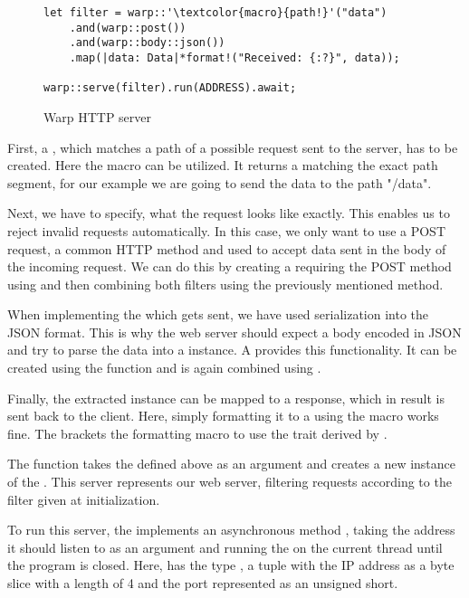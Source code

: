 \begin{figure}[ht]
    \begin{verbatim}
let filter = warp::'\textcolor{macro}{path!}'("data")
    .and(warp::post())
    .and(warp::body::json())
    .map(|data: Data|*format!("Received: {:?}", data));

warp::serve(filter).run(ADDRESS).await;
    \end{verbatim}
    \caption{Warp HTTP server}
    \label{http-server}
\end{figure}

First, a , which matches a path of a possible request sent to the server, has to be created. Here the
macro  can be utilized. It returns a  matching the exact path segment, for our
example we are going to send the data to the path "/data".

Next, we have to specify, what the request looks like exactly. This enables us to reject invalid requests
automatically. In this case, we only want to use a POST request, a common HTTP method and used to accept data sent in
the body of the incoming request. We can do this by creating a  requiring the POST method using
 and then combining both filters using the previously mentioned  method.

When implementing the  which gets sent, we have used serialization into the JSON format. This is why the
web server should expect a body encoded in JSON and try to parse the data into a  instance. A 
provides this functionality. It can be created using the function  and is again combined using
.

Finally, the extracted  instance can be mapped to a response, which in result is sent back to the client.
Here, simply formatting it to a  using the  macro works fine. The 
brackets the formatting macro to use the  trait derived by .

The function  takes the  defined above as an argument and creates a new instance of the
 . This server represents our web server, filtering requests according to the filter
given at initialization.

To run this server, the  implements an asynchronous method , taking the address it should listen
to as an argument and running the  on the current thread until the program is closed. Here, 
has the type , a tuple with the IP address as a byte slice with a length of 4 and the port
represented as an unsigned short.

